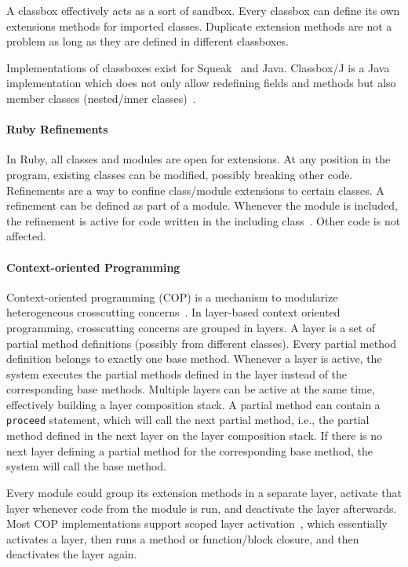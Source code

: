 A classbox effectively acts as a sort of sandbox. Every classbox can define its own extensions methods for imported classes. Duplicate extension methods are not a problem as long as they are defined in different classboxes. 

Implementations of classboxes exist for Squeak~\cite{bergel:inria-00533446} and Java. Classbox/J is a Java implementation which does not only allow redefining fields and methods but also member classes (nested/inner classes)~\cite{Bergel:2005:CCS:1094811.1094826}.

\paragraph{Ruby Refinements}
In Ruby, all classes and modules are open for extensions. At any position in the program, existing classes can be modified, possibly breaking other code. Refinements are a way to confine class/module extensions to certain classes. A refinement can be defined as part of a module. Whenever the module is included, the refinement is active for code written in the including class~\cite{Carlson:2015:RC:1212915}. Other code is not affected.

\paragraph{Context-oriented Programming}
Context-oriented programming (COP) is a mechanism to modularize heterogeneous crosscutting concerns~\cite{Hirschfeld08context-orientedprogramming}. In layer-based context oriented programming, crosscutting concerns are grouped in layers. A layer is a set of partial method definitions (possibly from different classes). Every partial method definition belongs to exactly one base method. Whenever a layer is active, the system executes the partial methods defined in the layer instead of the corresponding base methods. Multiple layers can be active at the same time, effectively building a layer composition stack. A partial method can contain a \texttt{proceed} statement, which will call the next partial method, i.e., the partial method defined in the next layer on the layer composition stack. If there is no next layer defining a partial method for the corresponding base method, the system will call the base method.

Every module could group its extension methods in a separate layer, activate that layer whenever code from the module is run, and deactivate the layer afterwards. Most COP implementations support scoped layer activation~\cite{Appeltauer:2009:CCP:1562112.1562118}, which essentially activates a layer, then runs a method or function/block closure, and then deactivates the layer again.

